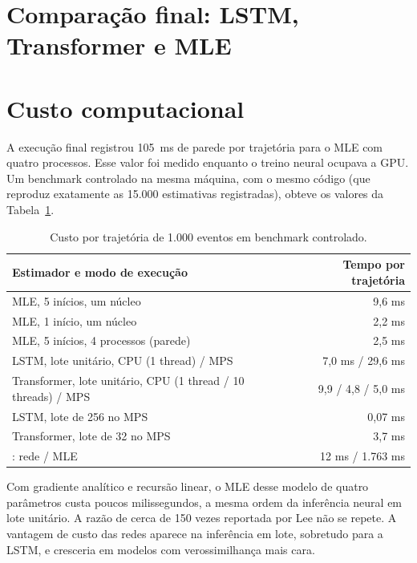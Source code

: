 \documentclass[12pt,a4paper,openany]{report}
\begin{document}
\section{Comparação final: LSTM, Transformer e MLE}





\section{Custo computacional}
\label{sec:custo}

A execução final registrou 105~ms de parede por trajetória para o MLE com quatro
processos. Esse valor foi medido enquanto o treino neural ocupava a GPU. Um benchmark
controlado na mesma máquina, com o mesmo código (que reproduz exatamente as 15.000
estimativas registradas), obteve os valores da Tabela~\ref{tab:custo}.

\begin{table}[htbp]
\centering
\caption{Custo por trajetória de 1.000 eventos em benchmark controlado.}
\label{tab:custo}
\small
\begin{tabular}{lr}
\toprule
Estimador e modo de execução & Tempo por trajetória\\
\midrule
MLE, 5 inícios, um núcleo & 9,6 ms\\
MLE, 1 início, um núcleo & 2,2 ms\\
MLE, 5 inícios, 4 processos (parede) & 2,5 ms\\
LSTM, lote unitário, CPU (1 thread) / MPS & 7,0 ms / 29,6 ms\\
Transformer, lote unitário, CPU (1 thread / 10 threads) / MPS & 9,9 / 4,8 / 5,0 ms\\
LSTM, lote de 256 no MPS & 0,07 ms\\
Transformer, lote de 32 no MPS & 3,7 ms\\
\midrule
\citet{lee2023}: rede / MLE & 12 ms / 1.763 ms\\
\bottomrule
\end{tabular}
\end{table}

Com gradiente analítico e recursão linear, o MLE desse modelo de quatro parâmetros
custa poucos milissegundos, a mesma ordem da inferência neural em lote unitário. A
razão de cerca de 150 vezes reportada por Lee não se repete. A vantagem de custo das
redes aparece na inferência em lote, sobretudo para a LSTM, e cresceria em modelos com
verossimilhança mais cara.
\end{document}
